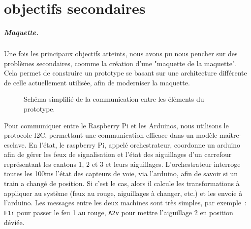 \documentclass[oneside, a4paper, 11pt]{book}
\begin{document}
\chapter{objectifs secondaires}
\label{sec:sidequests}

\paragraph{Maquette.} Une fois les principaux objectifs atteints, nous avons pu nous pencher sur des problèmes secondaires, coomme la création d'une "maquette de la maquette".
Cela permet de construire un prototype se basant sur une architecture différente de celle actuellement utilisée, afin de moderniser la maquette.

\begin{figure}[h]
	\centering
	\caption{Schéma simplifié de la communication entre les éléments du prototype.}
	\label{fig:prototype}
\end{figure}

Pour communiquer entre le Raspberry Pi et les Arduinos, nous utilisons le protocole I2C, permettant une communication efficace dans un modèle maître-esclave.
En l'état, le raspberry Pi, appelé orchestrateur, coordonne un arduino afin de gérer les feux de signalisation et l'état des aiguillages d'un carrefour représentant les cantons 1, 2 et 3 et leurs aiguillages.
L'orchestrateur interroge toutes les 100ms l'état des capteurs de voie, via l'arduino, afin de savoir si un train a changé de position. Si c'est le cas, alors il calcule les transformations à appliquer au système (feux au rouge, aiguillages à changer, etc.) et les envoie à l'arduino.
Les messages entre les deux machines sont très simples, par exemple~: \texttt{F1r} pour passer le feu 1 au rouge, \texttt{A2v} pour mettre l'aiguillage 2 en position déviée.
\end{document}

